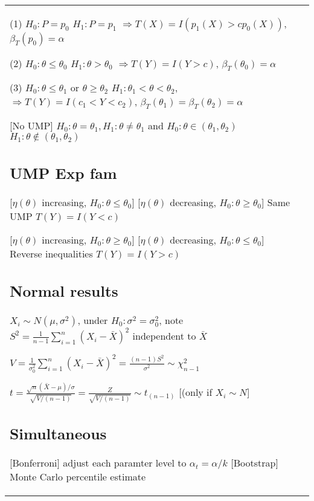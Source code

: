 \begin{tabulary}{\textwidth}{l || L}
	(1) $H_0: P=p_0$ $H_1: P=p_1$ $\Rightarrow T(X) = I(p_1(X) > cp_0(X))$,
	$\beta_T(p_0) = \alpha$

	(2) $H_0: \theta\leq \theta_0$ $H_1: \theta > \theta_0$ $\Rightarrow T(Y) =
		I(Y > c)$, $\beta_T(\theta_0)=\alpha$

	(3) $H_0: \theta\leq \theta_1$ or $\theta\geq\theta_2$ $H_1: \theta_1 <
		\theta < \theta_2$, $\Rightarrow T(Y) = I(c_1 < Y < c_2)$,
	$\beta_T(\theta_1) = \beta_T(\theta_2) = \alpha$

	[No UMP]
	$H_0: \theta=\theta_1, H_1: \theta\neq\theta_1$
	and $H_0: \theta\in(\theta_1, \theta_2)$ $H_1: \theta\notin(\theta_1, \theta_2)$

	\subsection{UMP Exp fam}

	[$\eta(\theta)$ increasing, $H_0:\theta\leq \theta_0$]
	[$\eta(\theta)$ decreasing, $H_0:\theta\geq \theta_0$]
	Same UMP $T(Y) = I(Y < c)$

	[$\eta(\theta)$ increasing, $H_0:\theta\geq \theta_0$]
		[$\eta(\theta)$ decreasing, $H_0:\theta\leq \theta_0$]
	Reverse inequalities $T(Y) = I(Y > c)$

	\subsection{Normal results}

	$X_i\sim N(\mu, \sigma^2)$, under $H_0: \sigma^2 = \sigma_0^2$, note $S^2=\frac{1}{n-1}\sum_{i=1}^n (X_i - \bar{X})^2$ independent to $\bar{X}$

	$V=\frac{1}{\sigma_0^2}\sum_{i=1}^n (X_i - \bar{X})^2 = \frac{(n-1)S^2}{\sigma^2} \sim \chi_{n-1}^2$

	$t = \frac{\sqrt{n}(\bar{X}-\mu)/\sigma}{\sqrt{V/(n-1)}} = \frac{Z}{\sqrt{V/(n-1)}} \sim t_{(n-1)}$ [(only if $X_i\sim N$]

	\subsection{Simultaneous}

	[Bonferroni] adjust each paramter level to $\alpha_t = \alpha/k$
	[Bootstrap] Monte Carlo percentile estimate


\end{tabulary}

